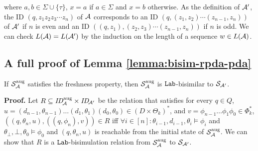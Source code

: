 where $a,b\in\Sigma\cup\{\tau\}$,
$x=a$ if $a\in\Sigma$ and $x=b$ otherwise.
As the definition of ${\cal A}'$,
the ID $(q,z_1z_2z_3\cdots z_n)$ of ${\cal A}$ corresponds to
an ID $(q, (z_1,z_2)\cdots(z_{n-1},z_n))$ of ${\cal A}'$ if $n$ is even and
an ID $((q,z_1), (z_2,z_3)\cdots(z_{n-1},z_n))$ if $n$ is odd.
We can check $L({\cal A})=L({\cal A}')$ by the induction on
the length of a sequence $w\in L({\cal A})$.


\subsection{A full proof of Lemma \ref{lemma:bisim-rpda-pda}}
\setcounter{lemma}{\ref{lemma:bisim-rpda-pda}}
\addtocounter{lemma}{-1}
\begin{lemma}
If ${\cal S}_{{\cal A}}^{\mathrm{aug}}$ satisfies the freshness property, then
${\cal S}_{{\cal A}}^{\mathrm{aug}}$ is $\mathtt{Lab}$-bisimilar to
${\cal S}_{{\cal A}'}$.
\end{lemma}
{\bf Proof.}\quad
Let $R\subseteq \mathit{ID}_{\!{\cal A}}^{\mathrm{aug}}\times\mathit{ID}_{\!{\cal A}'}$
be the relation
that satisfies
for every $q\in Q$, %
$u=(d_{n-1},\theta_{n-1})\ldots(d_1,\theta_1)(d_0,\theta_0)
 \in(D\times\Theta_k)^*$, and
$v=\phi_{n-1}\ldots\phi_1\phi_0\in\Phi_k^*$,
$((q,\theta_n,u),((q,\phi_n),v))\in R$
iff
$\forall i\in[n]: \theta_{i-1},d_{i-1},\theta_i\models\phi_i$ and
$\theta_{\bot},{\bot},\theta_0\models\phi_0$ and
$(q,\theta_n,u)$ is reachable from the initial state of
${\cal S}_{{\cal A}}^{\mathrm{aug}}$.
%
We can show that $R$ is a $\mathtt{Lab}$-bisimulation relation from
${\cal S}_{{\cal A}}^{\mathrm{aug}}$ to ${\cal S}_{{\cal A}'}$.

